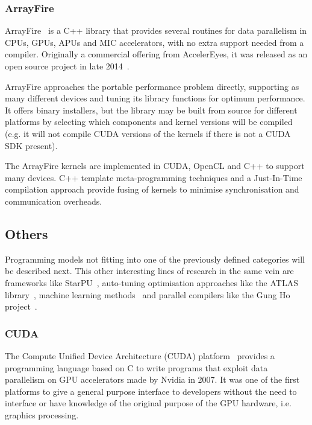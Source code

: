 \subsubsection{ArrayFire}

ArrayFire~\cite{malcolm2012arrayfire} is a C++ library that provides several routines for data parallelism in CPUs, GPUs, APUs and MIC accelerators, with no extra support needed from a compiler. Originally a commercial offering from AccelerEyes, it was released as an open source project in late 2014~\cite{5_arrayfire_2014}.

ArrayFire approaches the portable performance problem directly, supporting as many different devices and tuning its library functions for optimum performance. It offers binary installers, but the library may be built from source for different platforms by selecting which components and kernel versions will be compiled (e.g. it will not compile CUDA versions of the kernels if there is not a CUDA SDK present).

The ArrayFire \glspl{kernel} are implemented in CUDA, OpenCL and C++ to support many devices. C++ template meta-programming techniques and a Just-In-Time compilation approach provide fusing of kernels to minimise synchronisation and communication overheads.


\subsection{Others}

Programming models not fitting into one of the previously defined categories will be described next. This other interesting lines of research in the same vein are frameworks like StarPU~\cite{augonnet2011starpu}, auto-tuning optimisation approaches like the ATLAS library~\cite{whaley2001automated}, machine learning methods~\cite{ganapathi2009case} and parallel compilers like the Gung Ho project~\cite{ford2013}.

\subsubsection{CUDA}

The Compute Unified Device Architecture (CUDA) platform~\cite{3_nvidia.com_2015} provides a programming language based on C to write programs that exploit data parallelism on GPU accelerators made by Nvidia in 2007. It was one of the first platforms to give a general purpose interface to developers without the need to interface or have knowledge of the original purpose of the GPU hardware, i.e. graphics processing.

